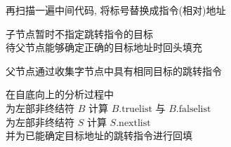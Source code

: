 
\begin{frame}{}
  \begin{center}

    \vspace{0.60cm}

    \pause
    \vspace{0.80cm}
    再扫描一遍中间代码, 将标号替换成指令(相对)地址

    \pause
    \vspace{1.20cm}
  \end{center}
\end{frame}

\begin{frame}{}
  \begin{center}

    \vspace{0.30cm}

    \pause
    \vspace{0.50cm}
    子节点暂时不指定跳转指令的目标 \\[5pt]
    待父节点能够确定正确的目标地址时回头填充

    \pause
    \vspace{0.50cm}
    父节点通过收集字节点中具有相同目标的跳转指令
  \end{center}
\end{frame}

\begin{frame}{}
  \begin{center}
    在自底向上的分析过程中 \\[15pt]
    为左部非终结符 $B$ 计算 $B.\text{truelist}$ 与 $B.\text{falselist}$ \\[10pt]
    为左部非终结符 $S$ 计算 $S.\text{nextlist}$ \\[10pt]
    并为已能确定目标地址的跳转指令进行回填
  \end{center}
\end{frame}


